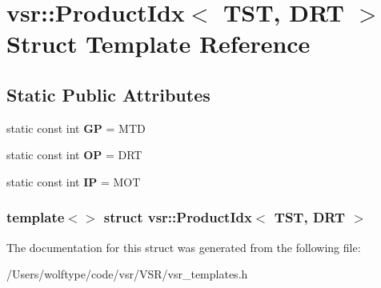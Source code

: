 \hypertarget{structvsr_1_1_product_idx_3_01_t_s_t_00_01_d_r_t_01_4}{\section{vsr\-:\-:Product\-Idx$<$ T\-S\-T, D\-R\-T $>$ Struct Template Reference}
\label{structvsr_1_1_product_idx_3_01_t_s_t_00_01_d_r_t_01_4}
}
\subsection*{Static Public Attributes}
\begin{DoxyCompactItemize}
\item 
\hypertarget{structvsr_1_1_product_idx_3_01_t_s_t_00_01_d_r_t_01_4_ae8c5aff741d7c992c62a77d8dd63497e}{static const int {\bfseries G\-P} = M\-T\-D}\label{structvsr_1_1_product_idx_3_01_t_s_t_00_01_d_r_t_01_4_ae8c5aff741d7c992c62a77d8dd63497e}

\item 
\hypertarget{structvsr_1_1_product_idx_3_01_t_s_t_00_01_d_r_t_01_4_a9b122b141a4d05c5ecf1237aad6a7f88}{static const int {\bfseries O\-P} = D\-R\-T}\label{structvsr_1_1_product_idx_3_01_t_s_t_00_01_d_r_t_01_4_a9b122b141a4d05c5ecf1237aad6a7f88}

\item 
\hypertarget{structvsr_1_1_product_idx_3_01_t_s_t_00_01_d_r_t_01_4_a992627bff15f3a51413acd0a92ae060f}{static const int {\bfseries I\-P} = M\-O\-T}\label{structvsr_1_1_product_idx_3_01_t_s_t_00_01_d_r_t_01_4_a992627bff15f3a51413acd0a92ae060f}

\end{DoxyCompactItemize}
\subsubsection*{template$<$$>$ struct vsr\-::\-Product\-Idx$<$ T\-S\-T, D\-R\-T $>$}



The documentation for this struct was generated from the following file\-:\begin{DoxyCompactItemize}
\item 
/\-Users/wolftype/code/vsr/\-V\-S\-R/vsr\-\_\-templates.\-h\end{DoxyCompactItemize}
